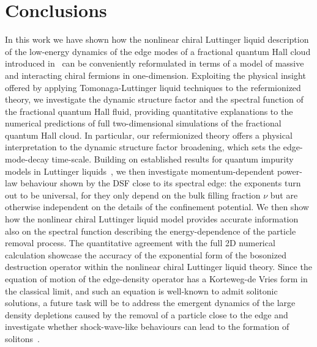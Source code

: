 \documentclass[twocolumn,pra,superscriptaddress,noshowpacs]{revtex4}
\begin{document}
\section{Conclusions}\label{sec:conclusions}
In this work we have shown how the nonlinear chiral Luttinger liquid description of the low-energy dynamics of the edge modes of a fractional quantum Hall cloud introduced in~\cite{Nardin_PRA_2023} can be conveniently reformulated in terms of a model of massive and interacting chiral fermions in one-dimension.
Exploiting the physical insight offered by applying Tomonaga-Luttinger liquid techniques to the refermionized theory, we investigate the dynamic structure factor and the spectral function of the fractional quantum Hall fluid, providing quantitative explanations to the numerical predictions of full two-dimensional simulations of the fractional quantum Hall cloud.
In particular, our refermionized theory offers a physical interpretation to the dynamic structure factor broadening, which sets the edge-mode-decay time-scale. 
Building on established results for quantum impurity models in Luttinger liquids~\cite{ImambekovGlazman_RMP_2012}, we then investigate momentum-dependent power-law behaviour shown by the DSF close to its spectral edge:
the exponents turn out to be universal, for they only depend on the bulk filling fraction $\nu$ but are otherwise independent on the details of the confinement potential.
We then show how the nonlinear chiral Luttinger liquid model provides accurate information also on the spectral function describing the energy-dependence of the particle removal process. The quantitative agreement with the full 2D numerical calculation showcase the accuracy of the exponential form of the bosonized destruction operator within the nonlinear chiral Luttinger liquid theory.
Since the equation of motion of the edge-density operator has a Korteweg-de Vries form in the classical limit, and such an equation is well-known to admit solitonic solutions, a future task will be to address the emergent dynamics of the large density depletions caused by the removal of a particle close to the edge and investigate whether shock-wave-like behaviours can lead to the formation of solitons~\cite{Bettelheim_PRL_2006,Wiegmann_PRL_2012}.
\end{document}
